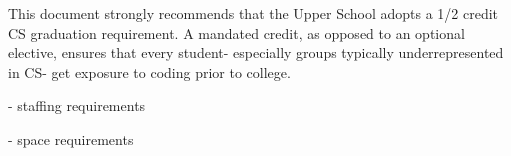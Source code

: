  \par
This document strongly recommends that the Upper School adopts a 1/2 credit CS graduation requirement. A mandated credit, as opposed to an optional elective, ensures that every student- especially groups typically underrepresented in CS- get exposure to coding prior to college. \par


- staffing requirements \par
- space requirements \par